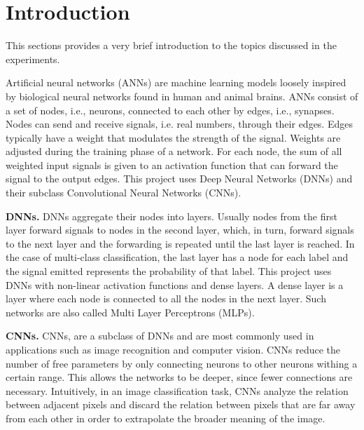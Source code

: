 \section{Introduction}
\label{sec:intro}
This sections provides a very brief introduction to the topics discussed in the experiments.

Artificial neural networks (ANNs) are machine learning models loosely inspired by biological neural networks found in human and animal brains. ANNs consist of a set of nodes, i.e., neurons, connected to each other by edges, i.e., synapses. Nodes can send and receive signals, i.e. real numbers, through their edges. Edges typically have a weight that modulates the strength of the signal. Weights are adjusted during the training phase of a network. For each node, the sum of all weighted input signals is given to an activation function that can forward the signal to the output edges. This project uses Deep Neural Networks (DNNs) and their subclass Convolutional Neural Networks (CNNs).

\textbf{DNNs.} DNNs aggregate their nodes into layers. Usually nodes from the first layer forward signals to nodes in the second layer, which, in turn, forward signals to the next layer and the forwarding is repeated until the last layer is reached. In the case of multi-class classification, the last layer has a node for each label and the signal emitted represents the probability of that label. This project uses DNNs with non-linear activation functions and dense layers. A dense layer is a layer where each node is connected to all the nodes in the next layer. Such networks are also called Multi Layer Perceptrons (MLPs).

\textbf{CNNs.} CNNs, are a subclass of DNNs and are most commonly used in applications such as image recognition and computer vision. CNNs reduce the number of free parameters by only connecting neurons to other neurons withing a certain range. This allows the networks to be deeper, since fewer connections are necessary. Intuitively, in an image classification task, CNNs analyze the relation between adjacent pixels and discard the relation between pixels that are far away from each other in order to extrapolate the broader meaning of the image.
